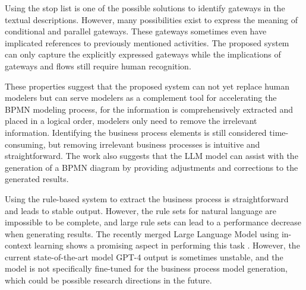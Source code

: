 Using the stop list is one of the possible solutions to identify gateways in the textual descriptions. However, many possibilities exist to express the meaning of conditional and parallel gateways. These gateways sometimes even have implicated references to previously mentioned activities. The proposed system can only capture the explicitly expressed gateways while the implications of gateways and flows still require human recognition. 

These properties suggest that the proposed system can not yet replace human modelers but can serve modelers as a complement tool for accelerating the BPMN modeling process, for the information is comprehensively extracted and placed in a logical order, modelers only need to remove the irrelevant information. Identifying the business process elements is still considered time-consuming, but removing irrelevant business processes is intuitive and straightforward. The work also suggests that the LLM model can assist with the generation of a BPMN diagram by providing adjustments and corrections to the generated results.

Using the rule-based system to extract the business process is straightforward and leads to stable output. However, the rule sets for natural language are impossible to be complete, and large rule sets can lead to a performance decrease when generating results. The recently merged Large Language Model using in-context learning shows a promising aspect in performing this task \cite{LLM_2} \cite{LLM_1}. However, the current state-of-the-art model GPT-4 output is sometimes unstable, and the model is not specifically fine-tuned for the business process model generation, which could be possible research directions in the future. 
